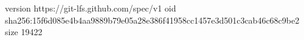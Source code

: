 version https://git-lfs.github.com/spec/v1
oid sha256:15f6d085e4b4aa9889b79e05a28e386f41958cc1457e3d501c3cab46c68c9be2
size 19422
